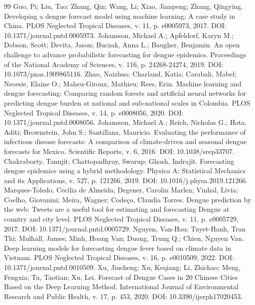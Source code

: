 \documentclass[12pt,a4paper]{article}
\begin{document}
\begin{thebibliography}{99}
 Guo, Pi; Liu, Tao; Zhang, Qin; Wang, Li; Xiao, Jianpeng; Zhang, Qingying. Developing a dengue forecast model using machine learning: A case study in China. PLOS Neglected Tropical Diseases, v. 11, p. e0005973, 2017. DOI: 10.1371/journal.pntd.0005973.
 Johansson, Michael A.; Apfeldorf, Karyn M.; Dobson, Scott; Devita, Jason; Buczak, Anna L.; Baugher, Benjamin. An open challenge to advance probabilistic forecasting for dengue epidemics. Proceedings of the National Academy of Sciences, v. 116, p. 24268-24274, 2019. DOI: 10.1073/pnas.1909865116.
 Zhao, Naizhuo; Charland, Katia; Carabali, Mabel; Nsoesie, Elaine O.; Maheu-Giroux, Mathieu; Rees, Erin. Machine learning and dengue forecasting: Comparing random forests and artificial neural networks for predicting dengue burden at national and sub-national scales in Colombia. PLOS Neglected Tropical Diseases, v. 14, p. e0008056, 2020. DOI: 10.1371/journal.pntd.0008056.
 Johansson, Michael A.; Reich, Nicholas G.; Hota, Aditi; Brownstein, John S.; Santillana, Mauricio. Evaluating the performance of infectious disease forecasts: A comparison of climate-driven and seasonal dengue forecasts for Mexico. Scientific Reports, v. 6, 2016. DOI: 10.1038/srep33707.
 Chakraborty, Tanujit; Chattopadhyay, Swarup; Ghosh, Indrajit. Forecasting dengue epidemics using a hybrid methodology. Physica A: Statistical Mechanics and its Applications, v. 527, p. 121266, 2019. DOI: 10.1016/j.physa.2019.121266.
 Marques-Toledo, Cecilia de Almeida; Degener, Carolin Marlen; Vinhal, Livia; Coelho, Giovanini; Meira, Wagner; Codeço, Claudia Torres. Dengue prediction by the web: Tweets are a useful tool for estimating and forecasting Dengue at country and city level. PLOS Neglected Tropical Diseases, v. 11, p. e0005729, 2017. DOI: 10.1371/journal.pntd.0005729.
 Nguyen, Van-Hau; Tuyet-Hanh, Tran Thi; Mulhall, James; Minh, Hoang Van; Duong, Trung Q.; Chien, Nguyen Van. Deep learning models for forecasting dengue fever based on climate data in Vietnam. PLOS Neglected Tropical Diseases, v. 16, p. e0010509, 2022. DOI: 10.1371/journal.pntd.0010509.
 Xu, Jiucheng; Xu, Keqiang; Li, Zhichao; Meng, Fengxia; Tu, Taotian; Xu, Lei. Forecast of Dengue Cases in 20 Chinese Cities Based on the Deep Learning Method. International Journal of Environmental Research and Public Health, v. 17, p. 453, 2020. DOI: 10.3390/ijerph17020453.

\end{thebibliography}
\end{document}
